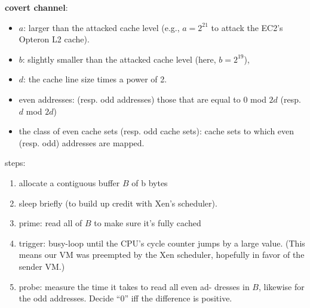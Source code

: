\documentclass[9pt,conference]{IEEEtran}
\begin{document}
\textbf{covert channel}:
\begin{itemize}
\item $a$: larger than the attacked cache level (e.g., $a = 2^{21}$ to attack the EC2’s Opteron L2 cache).
\item $b$: slightly smaller than the attacked cache level (here, $b = 2^{19}$),
\item $d$: the cache line size times a power of 2.
\item even addresses: (resp. odd addresses)  those that are equal to $0$ mod $2d$ (resp. $d$ mod $2d$)
\item the class of even cache sets (resp. odd cache sets): cache sets to which even (resp. odd) addresses are mapped.
\end{itemize}
steps:
\begin{enumerate}
\item allocate a contiguous buffer $B$ of b bytes
\item sleep briefly (to build up credit with Xen’s scheduler).
\item prime: read all of $B$ to make sure it’s fully cached
\item trigger: busy-loop until the CPU’s cycle counter jumps by a large value. (This means our VM was preempted by the Xen scheduler, hopefully in favor of the sender VM.)
\item probe: measure the time it takes to read all even ad- dresses in $B$, likewise for the odd addresses. Decide “0” iff the difference is positive.
\end{enumerate}
\end{document}
